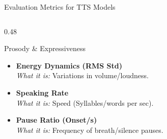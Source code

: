 \documentclass{beamer}
\begin{document}
\begin{frame}{Evaluation Metrics for TTS Models}
\begin{columns}[T]
\begin{column}{0.48\textwidth}
\begin{block}{Prosody \& Expressiveness}
\begin{itemize}
                    \item \textbf{Energy Dynamics (RMS Std)} \\
                          \textit{What it is:} Variations in volume/loudness. \\
                          
                    \item \textbf{Speaking Rate} \\
                          \textit{What it is:} Speed (Syllables/words per sec). \\
                          
                    \item \textbf{Pause Ratio (Onset/s)} \\
                          \textit{What it is:} Frequency of breath/silence pauses. \\
                \end{itemize}
            \end{block}
        \end{column}

    \end{columns}
    
    
    
\end{frame}
\end{document}
